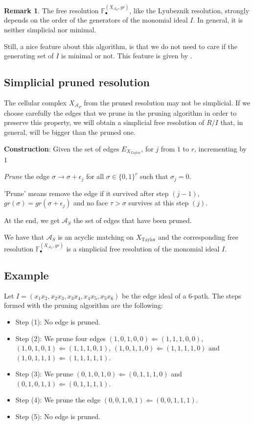 \documentclass[paper=a4, fontsize=11pt]{scrartcl} %
\theoremstyle{plain}
\theoremstyle{definition}
\newtheorem{remk}[thm]{Remark}
\begin{document}
\begin{remk}
The free resolution $\mathbb{F}_{\bullet}^{(X_{\mathcal{A}_P},gr)}$, like the Lyubeznik resolution, strongly depends on the order of the generators of the monomial ideal $I$. In general, it is neither simplicial nor minimal.
\end{remk}

Still, a nice feature about this algorithm, is that we do not need to care if the generating set of $I$ is minimal or not. This feature is given by \cite[Lemma 3.6]{AlFeGi17}.

\subsection{Simplicial pruned resolution}
The cellular complex $X_{\mathcal{A}_P}$ from the pruned resolution may not be simplicial. If we choose carefully the edges that we prune in the pruning algorithm in order to preserve this property, we will obtain a simplicial free resolution of $R/I$ that, in general, will be bigger than the pruned one.

\textbf{Construction}: Given the set of edges $E_{X_{\text{Taylor}}}$, for $j$ from $1$ to $r$, incrementing by $1$

\textit{Prune} the edge $\sigma \longrightarrow \sigma + \epsilon_j$ for all $\sigma \in \lbrace 0, 1 \rbrace^r$ such that $\sigma_j = 0$.

'Prune' means remove the edge if it survived after step $(j-1)$, $gr(\sigma) = gr(\sigma + \epsilon_j)$ and no face $\tau > \sigma$ survives at this step $(j)$.

At the end, we get $\mathcal{A}_S$ the set of edges that have been pruned.

We have that $\mathcal{A}_S$ is an acyclic matching on $X_{\text{Taylor}}$ and the corresponding free resolution $\mathbb{F}_{\bullet}^{(X_{\mathcal{A}_S},gr)}$ is a simplicial free resolution of the monomial ideal $I$.

\subsection{Example}
Let $I = (x_1 x_2, x_2 x_3, x_3 x_4, x_4 x_5, x_5 x_6)$ be the edge ideal of a 6-path. The steps formed with the pruning algorithm are the following:
\begin{itemize}
\item Step (1): No edge is pruned.
\item Step (2): We prune four edges $(1,0,1,0,0) \Leftarrow (1,1,1,0,0)$, $(1,0,1,0,1) \Leftarrow (1,1,1,0,1)$, $(1,0,1,1,0) \Leftarrow (1,1,1,1,0)$ and $(1,0,1,1,1) \Leftarrow (1,1,1,1,1)$.
\item Step (3): We prune $(0,1,0,1,0) \Leftarrow (0,1,1,1,0)$ and $(0,1,0,1,1) \Leftarrow (0,1,1,1,1)$.
\item Step (4): We prune the edge $(0,0,1,0,1) \Leftarrow (0,0,1,1,1)$.
\item Step (5): No edge is pruned.
\end{itemize}
\end{document}
